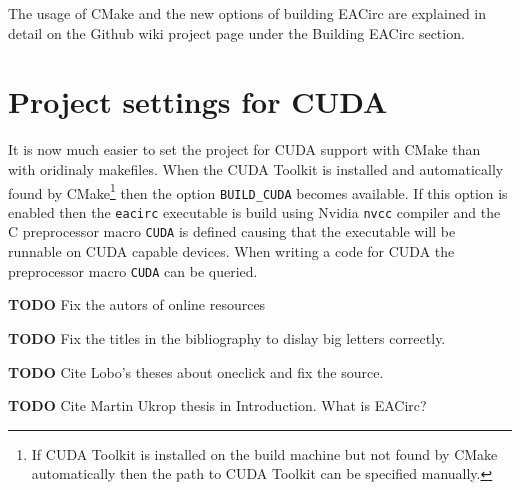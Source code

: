 \documentclass[12pt,oneside]{fithesis2}
\newcommand{\todo}{
	\noindent
	{\large\color{red}\textbf{TODO}}
}
\begin{document}
The usage of CMake and the new options of building EACirc are explained in detail on the Github wiki project page under the Building EACirc section.

\section{Project settings for CUDA}

It is now much easier to set the project for CUDA support with CMake than with oridinaly makefiles. When the CUDA Toolkit \cite{cuda_toolkit} is installed and automatically found by CMake\footnote{If CUDA Toolkit is installed on the build machine but not found by CMake automatically then the path to CUDA Toolkit can be specified manually.} then the option \texttt{BUILD\_CUDA} becomes available. If this option is enabled then the \texttt{eacirc} executable is build using Nvidia \cite{nvidia} \texttt{nvcc} compiler and the C preprocessor macro \texttt{CUDA} is defined causing that the executable will be runnable on CUDA capable devices. When writing a code for CUDA the preprocessor macro \texttt{CUDA} can be queried.

\printbibliography[heading=bibintoc]
\todo{Fix the autors of online resources}

\todo{Fix the titles in the bibliography to dislay big letters correctly.}

\todo{Cite Lobo's theses about oneclick and fix the source.}

\todo{Cite Martin Ukrop thesis in Introduction. What is EACirc?}
\end{document}

